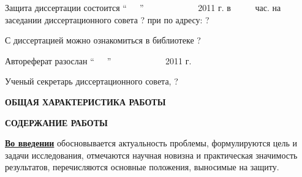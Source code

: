 \documentclass[12pt,a4paper]{article}
\makeatletter
\theoremstyle{definition}
\theoremstyle{plain}
\renewcommand{\@oddhead}{\hfill{\large \thepage}\hfill}
\renewcommand{\@oddfoot}{}
\renewcommand{\@evenhead}{\hfill{\large \thepage}\hfill}
\renewcommand{\@evenfoot}{}
\newcommand{\afsection}[1]{\par \begin{center}\textbf{\MakeUppercase{#1}}\end{center}}
\newcommand{\afsubsection}[1]{\par \underline{\textbf{#1}}}
\makeatother
\begin{document}
\vspace*{\fill}

\noindent
Защита диссертации состоится ``\ \ \ '' \hspace{1mm} \ \ \ \ \ \ \ \ \ \ \ \ 
2011 г. в \ \ \ \ \  час.  на заседании диссертационного совета 
? %
при %
по адресу: ?%


\vspace{1cm}

\noindent
С диссертацией можно ознакомиться в библиотеке
? %


\vspace{1cm}

\noindent
Автореферат разослан \hspace{2mm}``\ \ \ '' \hspace{1mm}
\ \ \ \ \ \ \ \ \ \ \ \  2011 г.


\vspace*{\fill}
\noindent Ученый секретарь
диссертационного совета, \hspace*{\fill}?\\%




\setlength{\topmargin}{-5mm} \makeatletter
\renewcommand{\@oddhead}{\hfill{\large \thepage}\hfill}
\renewcommand{\@oddfoot}{}
\renewcommand{\@evenhead}{\hfill{\large \thepage}\hfill}
\renewcommand{\@evenfoot}{}
\makeatother

\newpage
\afsection{Общая характеристика работы}



\newpage
\afsection{Содержание работы}

\afsubsection{Во введении} обосновывается актуальность проблемы, формулируются цель и задачи исследования, отмечаются научная новизна и практическая значимость результатов, перечисляются основные положения, выносимые на защиту.
\end{document}

